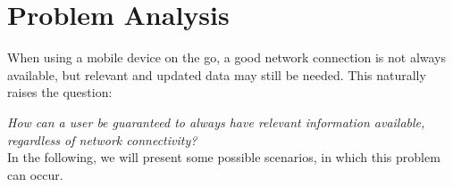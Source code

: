 \chapter{Problem Analysis}
\label{chap:prob}
When using a mobile device on the go, a good network connection is not always available, but relevant and updated data may still be needed. This naturally raises the question:

\textit{How can a user be guaranteed to always have relevant information available, regardless of network connectivity?}\\

\noindent In the following, we will present some possible scenarios, in which this problem can occur.

%
%
%


%

